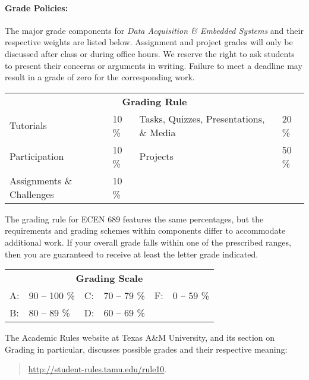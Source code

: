 \documentclass{article}
\begin{document}
\paragraph{Grade Policies:}
The major grade components for \emph{Data Acquisition \& Embedded Systems} and their respective weights are listed below.
Assignment and project grades will only be discussed after class or during office hours.
We reserve the right to ask students to present their concerns or arguments in writing.
Failure to meet a deadline may result in a grade of zero for the corresponding work.
\begin{center}
\begin{tabular}{lp{15mm}lp{15mm}}
\multicolumn{4}{c}{\textbf{Grading Rule}} \\
Tutorials & 10 \% & Tasks, Quizzes, Presentations, \& Media & 20 \% \\
Participation & 10 \% & Projects & 50 \% \\
Assignments \& Challenges & 10 \%
\end{tabular}
\end{center}
The grading rule for ECEN 689 features the same percentages, but the requirements and grading schemes within components differ to accommodate additional work.
If your overall grade falls within one of the prescribed ranges, then you are guaranteed to receive at least the letter grade indicated.
\begin{center}
\begin{tabular}{lp{25mm}lp{25mm}lp{25mm}}
\multicolumn{6}{c}{\textbf{Grading Scale}} \\
A: & 90 -- 100 \% & C: & 70 -- 79 \% & F: & 0 -- 59 \% \\
B: & 80 -- 89 \% & D: & 60 -- 69 \%
\end{tabular}
\end{center}
The Academic Rules website at Texas A\&M University, and its section on Grading in particular, discusses possible grades and their respective meaning:
\begin{quote}
\url{http://student-rules.tamu.edu/rule10}.
\end{quote}


%
\end{document}
